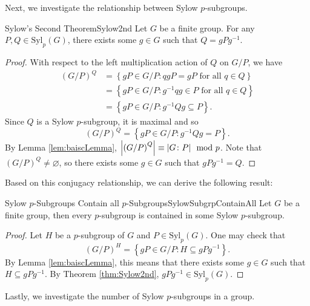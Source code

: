 \documentclass[math]{amznotes}
\theoremstyle{remark}
\newcommand{\0}{\mathbf{0}}
\newcommand{\1}{\mathbf{1}}
\begin{document}
Next, we investigate the relationship between Sylow $p$-subgroups.
\begin{thmbox}{Sylow's Second Theorem}{Sylow2nd}
    Let $G$ be a finite group. For any $P, Q \in \mathrm{Syl}_p\left(G\right)$, there exists some $g \in G$ such that $Q = gPg^{-1}$.
    \tcblower
    \begin{proof}
        With respect to the left multiplication action of $Q$ on $G \slash P$, we have 
        \begin{align*}
            \left(G \slash P\right)^Q & = \left\{gP \in G \slash P \colon qgP = gP \textrm{ for all } q \in Q\right\} \\
            & = \left\{gP \in G \slash P \colon g^{-1}qg \in P \textrm{ for all } q \in Q\right\} \\
            & = \left\{gP \in G \slash P \colon g^{-1}Qg \subseteq P\right\}.
        \end{align*}
        Since $Q$ is a Sylow $p$-subgroup, it is maximal and so 
        \begin{equation*}
            \left(G \slash P\right)^Q = \left\{gP \in G \slash P \colon g^{-1}Qg = P\right\}.
        \end{equation*}
        By Lemma \ref{lem:baiscLemma}, ${\left\lvert {\left(G \slash P\right)^Q} \right\rvert} \equiv {\left\lvert {G \colon P} \right\rvert} \mod p$. Note that $\left(G \slash P\right)^Q \neq \varnothing$, so there exists some $g \in G$ such that $gPg^{-1} = Q$.
    \end{proof}
\end{thmbox}
Based on this conjugacy relationship, we can derive the following result:
\begin{corbox}{Sylow $p$-Subgroups Contain all $p$-Subgroups}{SylowSubgrpContainAll}
    Let $G$ be a finite group, then every $p$-subgroup is contained in some Sylow $p$-subgroup. 
    \tcblower
    \begin{proof}
        Let $H$ be a $p$-subgroup of $G$ and $P \in \mathrm{Syl}_p\left(G\right)$. One may check that 
        \begin{equation*}
            \left(G \slash P\right)^H = \left\{gP \in G \slash P \colon H \subseteq gPg^{-1}\right\}.
        \end{equation*}
        By Lemma \ref{lem:baiscLemma}, this means that there exists some $g \in G$ such that $H \subseteq gPg^{-1}$. By Theorem \ref{thm:Sylow2nd}, $gPg^{-1} \in \mathrm{Syl}_p\left(G\right)$.
    \end{proof}
\end{corbox}
Lastly, we investigate the number of Sylow $p$-subgroups in a group.
\end{document}
